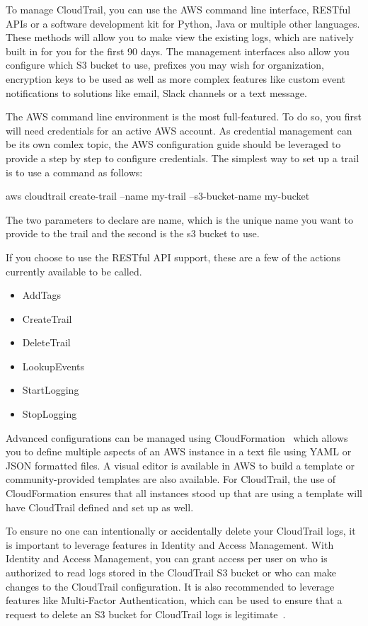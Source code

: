 To manage CloudTrail, you can use the AWS command line interface, RESTful APIs
or a software development kit for Python, Java or multiple other languages. 
These methods will allow you to make view the existing logs, which are natively 
built in for you for the first 90 days. The management interfaces also allow
you configure which S3 bucket to use, prefixes you may wish for organization, 
encryption keys to be used as well as more complex features like custom event
notifications to solutions like email, Slack channels or a text message.

The AWS command line environment is the most full-featured. To do so, you first 
will need credentials for an active AWS account. As credential management can 
be its own comlex topic,  the AWS configuration guide should be leveraged to 
provide a step by step to configure credentials. The simplest way to set up a 
trail is to use a command as follows: 

aws cloudtrail create-trail --name my-trail --s3-bucket-name my-bucket

The two parameters to declare are name, which is the unique name you want to 
provide to the trail and the second is the s3 bucket to use.

If you choose to use the RESTful API support, these are a few of
the actions currently available to be called.

\begin{itemize}
\item AddTags
\item CreateTrail
\item DeleteTrail
\item LookupEvents
\item StartLogging
\item StopLogging
\end{itemize}

Advanced configurations can be managed using 
CloudFormation~\cite{hid-sp18-518-CloudTrail-CloudFormation} which allows you
to define multiple aspects of an AWS instance in a text file using YAML or 
JSON formatted files. A visual editor is available in AWS to build a template
or community-provided templates are also available. For CloudTrail, the use
of CloudFormation ensures that all instances stood up that are using a template
will have CloudTrail defined and set up as well.

To ensure no one can intentionally or accidentally delete your CloudTrail logs,
it is important to leverage features in Identity and Access Management. With 
Identity and Access Management, you can grant access per user on who is 
authorized to read logs stored in the CloudTrail S3 bucket 
or who can make changes to the CloudTrail configuration. It is also recommended 
to leverage features like Multi-Factor Authentication, which can be used to 
ensure that a request to delete an S3 bucket for CloudTrail logs is 
legitimate~\cite{hid-sp18-518-CloudTrail-user-guide}. 

